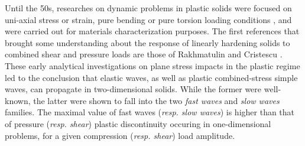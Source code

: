 



Until the 50s, researches on dynamic problems in plastic solids were focused on uni-axial stress or strain, pure bending or pure torsion loading conditions \cite{Taylor,vonKarman}, and were carried out for materials characterization purposes.
The first references that brought some understanding about the response of linearly hardening solids to combined shear and pressure loads are those of Rakhmatulin \cite{Rakhmatulin} and Cristescu \cite{CRISTESCU19591605}.
These early analytical investigations on plane stress impacts in the plastic regime led to the conclusion that elastic waves, as well as plastic combined-stress simple waves, can propagate in two-dimensional solids. 
While the former were well-known, the latter were shown to fall into the two \textit{fast waves} and \textit{slow waves} families.
The maximal value of fast waves (\textit{resp. slow waves}) is higher than that of pressure (\textit{resp. shear}) plastic discontinuity occuring in one-dimensional problems, for a given compression (\textit{resp. shear}) load amplitude.

